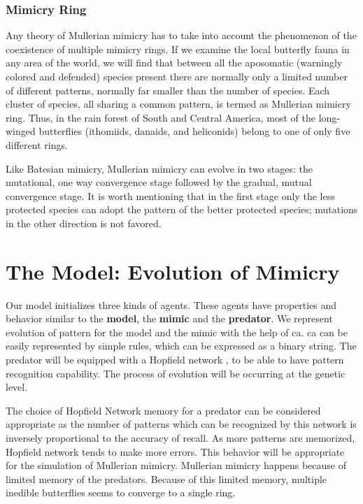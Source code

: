 \documentclass[letterpaper]{article}
\numberwithin{equation}{section}
\begin{document}
\subsubsection{Mimicry Ring}
Any theory of Mullerian mimicry has to take into account the phenomenon of the coexistence of multiple mimicry rings. If we examine the local butterfly fauna in any area of the world, we will find that between all the aposomatic (warningly colored and defended) species present there are normally only a limited number of different patterns, normally far smaller than the number of species. Each cluster of species, all sharing a common pattern, is termed as Mullerian mimicry ring. Thus, in the rain forest of South and Central America, most of the long-winged butterflies (ithomiids, danaids, and heliconids) belong to one of only five different rings.

Like Batesian mimicry, Mullerian mimicry can evolve in two stages: the mutational, one way convergence stage followed by the gradual, mutual convergence stage. It is worth mentioning that in the first stage only the less protected species can adopt the pattern of the better protected species; mutations in the other direction is not favored.

\section{The Model: Evolution of Mimicry}
\label{section:model}

Our model initializes three kinds of agents. These agents have properties and behavior similar to the \textbf{model}, the \textbf{mimic} and the \textbf{predator}. We represent evolution of pattern for the model and the mimic with the help of \gls{ca}. \gls{ca} can be easily represented by simple rules, which can be expressed as a binary string. The predator will be equipped with a Hopfield network \citep{hopfield1982}, to be able to have pattern recognition capability. The process of evolution will be occurring at the genetic level. 

The choice of Hopfield Network memory for a predator can be considered appropriate as the number of patterns which can be recognized by this network is inversely proportional to the accuracy of recall. As more patterns are memorized, Hopfield network tends to make more errors. This behavior will be appropriate for the simulation of Mullerian mimicry. Mullerian mimicry happens because of limited memory of the predators. Because of this limited memory, multiple inedible butterflies seems to converge to a single ring.
\end{document}
